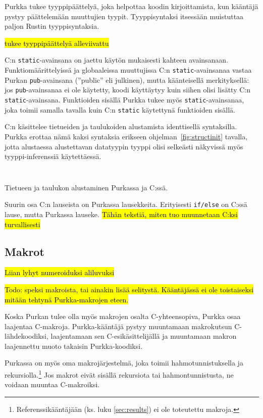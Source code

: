 Purkka tukee tyyppipäättelyä, joka helpottaa koodin kirjoittamista, kun
kääntäjä pystyy päättelemään muuttujien tyypit. Tyyppisyntaksi itsessään
muistuttaa paljon Rustin tyyppisyntaksia.

\hl{tukee tyyppipäättelyä alleviivattu}

C:n \texttt{static}-avainsana on jaettu käytön mukaisesti kahteen avainsanaan.
Funktiomäärittelyissä ja globaaleissa muuttujissa C:n
\texttt{static}-avainsanaa vastaa Purkan \texttt{pub}-avainsana (''public'' eli
julkinen), mutta käänteisellä merkityksellä: jos \texttt{pub}-avainsanaa ei ole
käytetty, koodi käyttäytyy kuin siihen olisi lisätty C:n
\texttt{static}-avainsana. Funktioiden sisällä Purkka tukee myös
\texttt{static}-avainsanaa, joka toimii samalla tavalla kuin C:n
\texttt{static} käytettynä funktioiden sisällä.

C:n käsittelee tietueiden ja taulukoiden alustamista identtisellä syntaksilla.
Purkka erottaa nämä kaksi syntaksia erikseen ohjelman~\ref{fig:structinit}
tavalla, jotta alustaessa alustettavan datatyypin tyyppi olisi selkeästi
näkyvissä myös tyyppi-inferenssiä käytettäessä.

\begin{listing}[ht!]
    \inputminted{Rust}{koodi/structinit.prk}
    \inputminted{C}{koodi/structinit.c}
    \caption{Tietueen ja taulukon alustaminen Purkassa ja C:ssä.}
    \label{fig:structinit}
\end{listing}

Suurin osa C:n lauseista on Purkassa lausekkeita. Erityisesti \texttt{if/else}
on C:ssä lause, mutta Purkassa lauseke. \hl{Tähän tekstiä, miten tuo muunnetaan
C:ksi turvallisesti}

\subsection{Makrot}

\hl{Liian lyhyt numeroiduksi aliluvuksi}

\hl{Todo: speksi makroista, tai ainakin lisää selitystä. Kääntäjässä ei ole
toistaiseksi mitään tehtynä Purkka-makrojen eteen.}

Koska Purkan tulee olla myös makrojen osalta C-yhteensopiva, Purkka osaa
laajentaa C-makroja. Purkka-kääntäjä pystyy muuntamaan makrokutsun
C-lähdekoodiksi, laajentamaan sen C-esikäsittelijällä ja muuntamaan makron
laajennettu muoto takaisin Purkka-koodiksi.

Purkassa on myös oma makrojärjestelmä, joka toimii hahmotunnistuksella ja
rekursiolla.\footnote{Referenssikääntäjään (ks. luku \ref{sec:results}) ei ole
toteutettu makroja.} Jos makrot eivät sisällä rekursiota tai hahmontunnistusta,
ne voidaan muuntaa C-makroiksi.

